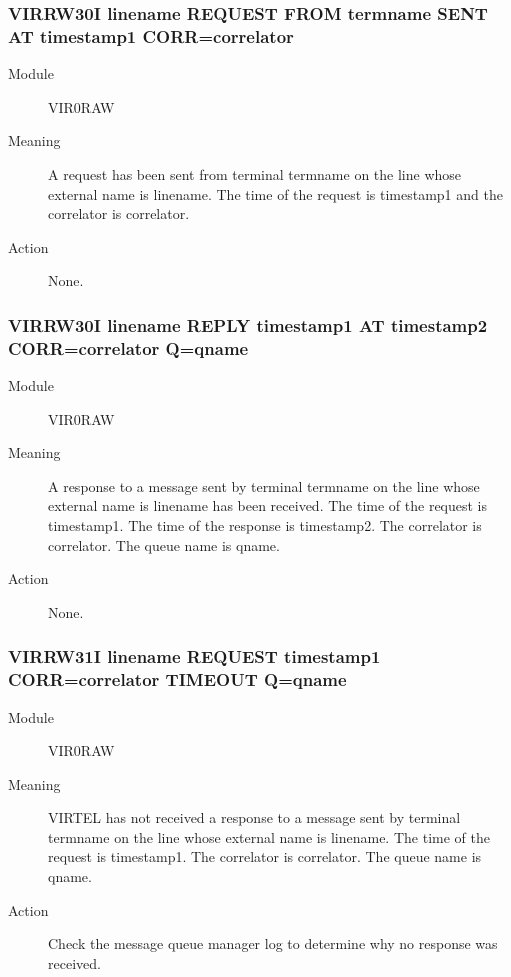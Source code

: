 \documentclass[letterpaper,10pt,english]{sphinxmanual}
\begin{document}
\subsubsection{VIRRW30I linename REQUEST FROM termname SENT AT timestamp1 CORR=correlator}
\label{\detokenize{messages:virrw30i-linename-request-from-termname-sent-at-timestamp1-corr-correlator}}\begin{description}
\item[{Module}] \leavevmode
VIR0RAW

\item[{Meaning}] \leavevmode
A request has been sent from terminal termname on the line whose external name is linename. The time of the request is timestamp1 and the correlator is correlator.

\item[{Action}] \leavevmode
None.

\end{description}


\subsubsection{VIRRW30I linename REPLY timestamp1 AT timestamp2 CORR=correlator Q=qname}
\label{\detokenize{messages:virrw30i-linename-reply-timestamp1-at-timestamp2-corr-correlator-q-qname}}\begin{description}
\item[{Module}] \leavevmode
VIR0RAW

\item[{Meaning}] \leavevmode
A response to a message sent by terminal termname on the line whose external name is linename has been received. The time of the request is timestamp1. The time of the response is timestamp2. The correlator is correlator. The queue name is qname.

\item[{Action}] \leavevmode
None.

\end{description}


\subsubsection{VIRRW31I linename REQUEST timestamp1 CORR=correlator TIMEOUT Q=qname}
\label{\detokenize{messages:virrw31i-linename-request-timestamp1-corr-correlator-timeout-q-qname}}\begin{description}
\item[{Module}] \leavevmode
VIR0RAW

\item[{Meaning}] \leavevmode
VIRTEL has not received a response to a message sent by terminal termname on the line whose external name is linename. The time of the request is timestamp1. The correlator is correlator. The queue name is qname.

\item[{Action}] \leavevmode
Check the message queue manager log to determine why no response was received.

\end{description}
\end{document}
